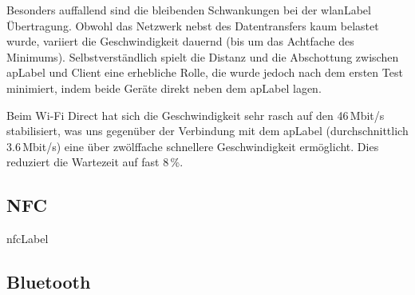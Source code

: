 Besonders auffallend sind die bleibenden Schwankungen bei der \gls{wlanLabel} Übertragung.
Obwohl das Netzwerk nebst des Datentransfers kaum belastet wurde, variiert die Geschwindigkeit dauernd (bis um das Achtfache des Minimums).
Selbstverständlich spielt die Distanz und die Abschottung zwischen \gls{apLabel} und Client eine erhebliche Rolle, die wurde jedoch nach dem ersten Test minimiert, indem beide Geräte direkt neben dem \gls{apLabel} lagen.

Beim Wi-Fi Direct hat sich die Geschwindigkeit sehr rasch auf den 46\,Mbit/s stabilisiert, was uns gegenüber der Verbindung mit dem \gls{apLabel} (durchschnittlich 3.6\,Mbit/s) eine über zwölffache schnellere Geschwindigkeit ermöglicht.
Dies reduziert die Wartezeit auf fast 8\,\%.

\subsection{NFC}
\gls{nfcLabel}


\subsection{Bluetooth}

